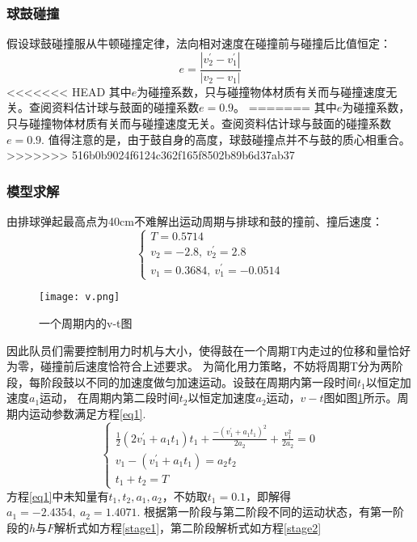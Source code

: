 \documentclass[withoutpreface,bwprint]{cumcmthesis} %
\begin{document}
\subsubsection{球鼓碰撞}
假设球鼓碰撞服从牛顿碰撞定律，法向相对速度在碰撞前与碰撞后比值恒定：
$$e=\frac{|v_2^{'}-v_1^{'}|}{|v_2-v_1|}$$
<<<<<<< HEAD
其中$e$为碰撞系数，只与碰撞物体材质有关而与碰撞速度无关。查阅资料估计球与鼓面的碰撞系数$e=0.9$。
=======
其中$e$为碰撞系数，只与碰撞物体材质有关而与碰撞速度无关。查阅资料估计球与鼓面的碰撞系数$e=0.9$.
值得注意的是，由于鼓自身的高度，球鼓碰撞点并不与鼓的质心相重合。
>>>>>>> 516b0b9024f6124c362f165f8502b89b6d37ab37
\subsubsection{模型求解}
由排球弹起最高点为40cm不难解出运动周期与排球和鼓的撞前、撞后速度：
\begin{equation*}
\left\{
\begin{array}{lr}
T = 0.5714 \\
v_2 = -2.8,\ v_2^{'} = 2.8 \\
v_1 = 0.3684,\ v_1^{'} = -0.0514
\end{array}
\right.
\end{equation*}
\begin{figure}
	\centering
	\texttt{[image: v.png]}
	\caption{一个周期内的v-t图}
	\label{vt} %
\end{figure}
因此队员们需要控制用力时机与大小，使得鼓在一个周期T内走过的位移和量恰好为零，碰撞前后速度恰符合上述要求。
为简化用力策略，不妨将周期T分为两阶段，每阶段鼓以不同的加速度做匀加速运动。设鼓在周期内第一段时间$t_1$以恒定加速度$a_1$运动，
在周期内第二段时间$t_2$以恒定加速度$a_2$运动，$v-t$图如图\ref{vt}所示。周期内运动参数满足方程\ref{eq1}.
\begin{equation}
\left\{
\begin{array}{lr}
\frac{1}{2}(2v_1^{'}+a_1t_1)t_1 + \frac{-(v_1^{'}+a_1t_1)^2}{2a_2}+\frac{v_1^2}{2a_2} = 0 \\
v_1-(v_1^{'}+a_1t_1) = a_2t_2 \\
t_1 + t_2 = T
\end{array}
\label{eq1}
\right.
\end{equation}
方程\ref{eq1}中未知量有$t_1, t_2, a_1, a_2$，不妨取$t_1=0.1$，即解得$a_1 = -2.4354,\ a_2 = 1.4071$.
根据第一阶段与第二阶段不同的运动状态，有第一阶段的$h$与$F$解析式如方程\ref{stage1}，第二阶段解析式如方程\ref{stage2}
\end{document}
